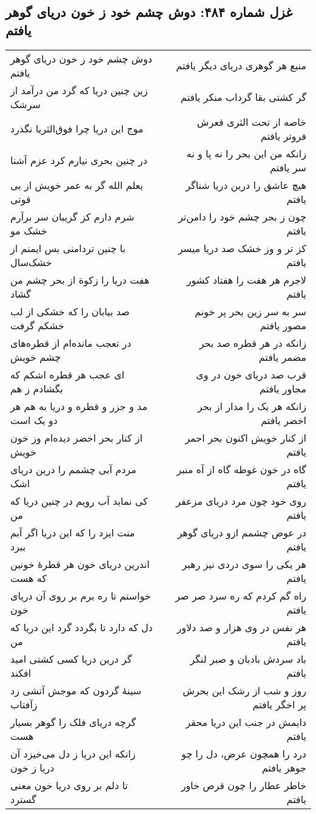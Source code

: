 \begin{center}
\section*{غزل شماره ۴۸۴: دوش چشم خود ز خون دریای گوهر یافتم}
\label{sec:484}
\begin{longtable}{l p{0.5cm} r}
دوش چشم خود ز خون دریای گوهر یافتم
&&
منبع هر گوهری دریای دیگر یافتم
\\
زین چنین دریا که گرد من درآمد از سرشک
&&
گر کشتی بقا گرداب منکر یافتم
\\
موج این دریا چرا فوق‌الثریا نگذرد
&&
خاصه از تحت الثری قعرش فروتر یافتم
\\
در چنین بحری نیارم کرد عزم آشنا
&&
زانکه من این بحر را نه پا و نه سر یافتم
\\
یعلم الله گر به عمر خویش از بی قوتی
&&
هیچ عاشق را درین دریا شناگر یافتم
\\
شرم دارم کز گریبان سر برآرم خشک مو
&&
چون ز بحر چشم خود را دامن‌تر یافتم
\\
با چنین تردامنی بس ایمنم از خشک‌سال
&&
کز تر و وز خشک صد دریا میسر یافتم
\\
هفت دریا را زکوة از بحر چشم من گشاد
&&
لاجرم هر هفت را هفتاد کشور یافتم
\\
صد بیابان را که خشکی از لب خشکم گرفت
&&
سر به سر زین بحر پر خونم مصور یافتم
\\
در تعجب مانده‌ام از قطره‌های چشم خویش
&&
زانکه در هر قطره صد بحر مضمر یافتم
\\
ای عجب هر قطره اشکم که بگشادم ز هم
&&
قرب صد دریای خون در وی مجاور یافتم
\\
مد و جزر و قطره و دریا به هم هر دو یک است
&&
زانکه هر یک را مدار از بحر اخضر یافتم
\\
از کنار بحر اخضر دیده‌ام وز خون خویش
&&
از کنار خویش اکنون بحر احمر یافتم
\\
مردم آبی چشمم را درین دریای اشک
&&
گاه در خون غوطه گاه از آه منبر یافتم
\\
کی نماید آب رویم در چنین دریا که من
&&
روی خود چون مرد دریای مزعفر یافتم
\\
منت ایزد را که این دریا اگر آبم ببرد
&&
در عوض چشمم ازو دریای گوهر یافتم
\\
اندرین دریای خون هر قطرهٔ خونین که هست
&&
هر یکی را سوی دردی نیز رهبر یافتم
\\
خواستم تا ره برم بر روی آن دریای خون
&&
راه گم کردم که ره سرد صر صر یافتم
\\
دل که دارد تا بگردد گرد این دریا که من
&&
هر نفس در وی هزار و صد دلاور یافتم
\\
گر درین دریا کسی کشتی امید افکند
&&
باد سردش بادبان و صبر لنگر یافتم
\\
سینهٔ گردون که موجش آتشی زد زآفتاب
&&
روز و شب از رشک این بحرش پر اخگر یافتم
\\
گرچه دریای فلک را گوهر بسیار هست
&&
دایمش در جنب این دریا محقر یافتم
\\
زانکه این دریا ز دل می‌خیزد آن دریا ز خون
&&
درد را همچون عرض، دل را چو جوهر یافتم
\\
تا دلم بر روی دریا خون معنی گسترد
&&
خاطر عطار را چون قرص خاور یافتم
\\
\end{longtable}
\end{center}
